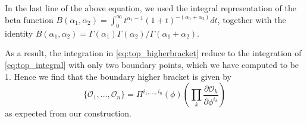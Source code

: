 \documentclass[11pt]{article}
\numberwithin{equation}{section}
\begin{document}
In the last line of the above equation, we used the integral representation of the beta function $B(\alpha_1,\alpha_2) = \int _{0}^{\infty}t^{\alpha_1-1}(1+t)^{-(\alpha_1+ \alpha_2)}dt$, together with the identity $B(\alpha_1,\alpha_2) = \Gamma(\alpha_1)\Gamma(\alpha_2)/\Gamma(\alpha_1+\alpha_2)$.

As a result, the integration in \eqref{eq:top_higherbracket} reduce to the integration of \eqref{eq:top_integral} with only two boundary points, which we have computed to be $1$. Hence we find that the boundary higher bracket is given by
\begin{equation}
	\{\mathcal{O}_1,\dots,\mathcal{O}_n\} = 	\Pi^{i_1,\dots,i_n}(\phi)\left(\prod_{k}\frac{\partial\mathcal{O}_k}{\partial \phi^{i_k}}\right)
\end{equation}
as expected from our construction.
\end{document}
